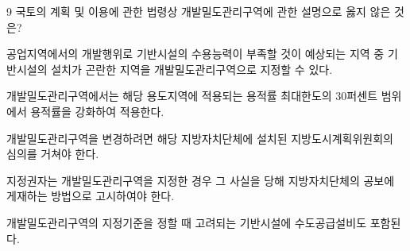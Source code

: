\begin{question}{9}
국토의 계획 및 이용에 관한 법령상 개발밀도관리구역에 관한 설명으로 옳지 않은 것은?
\begin{choices}
  \item 공업지역에서의 개발행위로 기반시설의 수용능력이 부족할 것이 예상되는 지역 중 기반시설의 설치가 곤란한 지역을 개발밀도관리구역으로 지정할 수 있다.
  \item 개발밀도관리구역에서는 해당 용도지역에 적용되는 용적률 최대한도의 30퍼센트 범위에서 용적률을 강화하여 적용한다.
  \item 개발밀도관리구역을 변경하려면 해당 지방자치단체에 설치된 지방도시계획위원회의 심의를 거쳐야 한다.
  \item 지정권자는 개발밀도관리구역을 지정한 경우 그 사실을 당해 지방자치단체의 공보에 게재하는 방법으로 고시하여야 한다.
  \item 개발밀도관리구역의 지정기준을 정할 때 고려되는 기반시설에 수도공급설비도 포함된다.
\end{choices}
\end{question}
